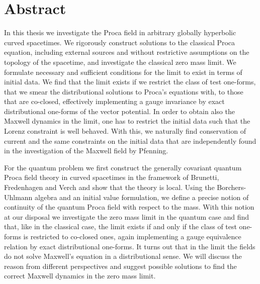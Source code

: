 \section*{Abstract}
In this thesis we investigate the Proca field in arbitrary globally hyperbolic curved spacetimes. We rigorously construct solutions to the classical Proca equation, including external sources and without restrictive assumptions on the topology of the spacetime, and investigate the classical zero mass limit. We formulate necessary and sufficient conditions for the limit to exist in terms of initial data. We find that the limit exists if we restrict the class of test one-forms, that we smear the distributional solutions to Proca's equations with, to those that are co-closed, effectively implementing a gauge invariance by exact distributional one-forms of the vector potential. In order to obtain also the Maxwell dynamics in the limit, one has to restrict the initial data such that the Lorenz constraint is well behaved. With this, we naturally find conservation of current and the same constraints on the initial data that are independently found in the investigation of the Maxwell field by Pfenning.\par
For the quantum problem we first construct the generally covariant quantum Proca field theory in curved spacetimes in the framework of Brunetti, Fredenhagen and Verch and show that the theory is local. Using the Borchers-Uhlmann algebra and an initial value formulation, we define a precise notion of continuity of the quantum Proca field with respect to the mass. With this notion at our disposal we investigate the zero mass limit in the quantum case and find that, like in the classical case, the limit exists if and only if the class of test one-forms is restricted to co-closed ones, again implementing a gauge equivalence relation by exact distributional one-forms. It turns out that in the limit the fields do not solve Maxwell's equation in a distributional sense. We will discuss the reason from different perspectives and suggest possible solutions to find the correct Maxwell dynamics in the zero mass limit.
